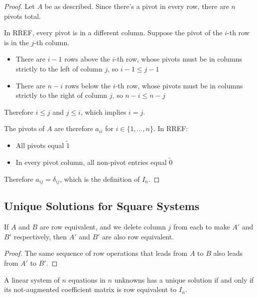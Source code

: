 \begin{proof}
    Let $A$ be as described. Since there's a pivot in every row, there are $n$ pivots total.
    
    In RREF, every pivot is in a different column. Suppose the pivot of the $i$-th row is in the $j$-th column.
    
    \begin{itemize}
        \item There are $i-1$ rows above the $i$-th row, whose pivots must be in columns strictly to the left of column $j$, so $i-1 \leq j-1$
        \item There are $n-i$ rows below the $i$-th row, whose pivots must be in columns strictly to the right of column $j$, so $n-i \leq n-j$
    \end{itemize}
    
    Therefore $i \leq j$ and $j \leq i$, which implies $i = j$.
    
    The pivots of $A$ are therefore $a_{ii}$ for $i \in \{1, \ldots, n\}$. In RREF:
    \begin{itemize}
        \item All pivots equal $\tilde{1}$
        \item In every pivot column, all non-pivot entries equal $\tilde{0}$
    \end{itemize}
    
    Therefore $a_{ij} = \delta_{ij}$, which is the definition of $I_n$.
\end{proof}

\subsection{Unique Solutions for Square Systems}

\begin{lemma}\label{lma:row-equiv-column-deletion}
    If $A$ and $B$ are row equivalent, and we delete column $j$ from each to make $A'$ and $B'$ respectively, then $A'$ and $B'$ are also row equivalent.
\end{lemma}

\begin{proof}
    The same sequence of row operations that leads from $A$ to $B$ also leads from $A'$ to $B'$.
\end{proof}

\begin{theorem}\label{thm:unique-solution-test}
    A linear system of $n$ equations in $n$ unknowns has a unique solution if and only if its not-augmented coefficient matrix is row equivalent to $I_n$.
\end{theorem}

